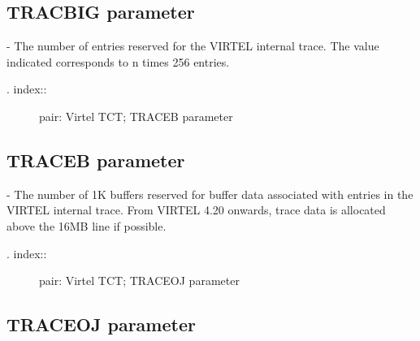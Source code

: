 \documentclass[letterpaper,10pt,english]{sphinxmanual}
\begin{document}
\subsection{TRACBIG parameter}
\label{\detokenize{Installation_Guide:tracbig-parameter}}
\begin{sphinxVerbatim}[commandchars=\\\{\}]
 
\end{sphinxVerbatim}

 - The number of entries reserved for the VIRTEL internal trace. The value indicated corresponds to n times 256 entries.
\begin{description}
\item[{. index::}] \leavevmode
pair: Virtel TCT; TRACEB parameter

\end{description}


\subsection{TRACEB parameter}
\label{\detokenize{Installation_Guide:traceb-parameter}}
\begin{sphinxVerbatim}[commandchars=\\\{\}]
 
\end{sphinxVerbatim}

 - The number of 1K buffers reserved for buffer data associated with entries in the VIRTEL internal trace. From VIRTEL 4.20 onwards, trace data is allocated above the 16MB line if possible.
\begin{description}
\item[{. index::}] \leavevmode
pair: Virtel TCT; TRACEOJ parameter

\end{description}


\subsection{TRACEOJ parameter}
\label{\detokenize{Installation_Guide:traceoj-parameter}}
\begin{sphinxVerbatim}[commandchars=\\\{\}]
 
\end{sphinxVerbatim}
\end{document}
